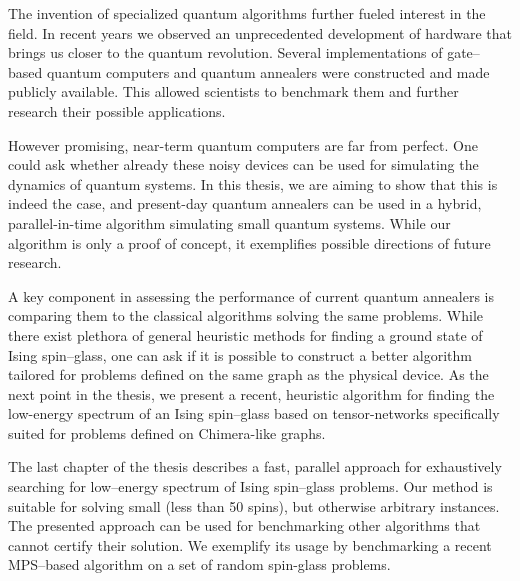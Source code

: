 The invention of specialized quantum algorithms further fueled interest in the field. In recent years we observed an unprecedented development of hardware that brings us closer to the quantum revolution. Several implementations of gate--based quantum computers \cite{ionq, bohnet} and quantum annealers \cite{johnson, dattani} were constructed and made publicly available. This allowed scientists to benchmark them and further research their possible applications.

However promising, near-term quantum computers are far from perfect. One could ask whether already
these noisy devices can be used for simulating the dynamics of quantum systems. In this thesis, we
are aiming to show that this is indeed the case, and present-day quantum annealers can be used in a
hybrid, parallel-in-time algorithm simulating small quantum systems. While our algorithm is only a
proof of concept, it exemplifies possible directions of future research.

A key component in assessing the performance of current quantum annealers is comparing them to the
classical algorithms solving the same problems. While there exist plethora of general heuristic
methods for finding a ground state of Ising spin--glass, one can ask if it is possible to construct
a better algorithm tailored for problems defined on the same graph as the physical device. As the
next point in the thesis, we present a recent, heuristic algorithm for finding the low-energy
spectrum of an Ising spin--glass based on tensor-networks specifically suited for problems defined
on Chimera-like graphs.

The last chapter of the thesis describes a fast, parallel approach for exhaustively searching for
low--energy spectrum of Ising spin--glass problems. Our method is suitable for solving small (less
than 50 spins), but otherwise arbitrary instances. The presented approach can be used for
benchmarking other algorithms that cannot certify their solution. We exemplify its usage by
benchmarking a recent MPS--based algorithm on a set of random spin-glass problems.

